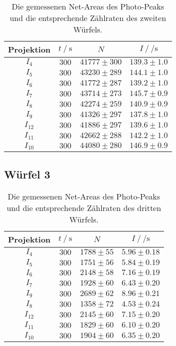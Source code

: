 \begin{table}[H]
  \centering
  \begin{tabular}{c c c c}
    \toprule
     Projektion &  $t \:/\: \si{\second}$ &     $N$ &           $I \:/\: \si{\per\second}$ \\
    \midrule
            $I_{  4}$ &   $300$ & $41777 \pm    300$ & $139.3\pm1.0$ \\
            $I_{  5}$ &   $300$ & $43230 \pm    289$ & $144.1\pm1.0$ \\
            $I_{  6}$ &   $300$ & $41772 \pm    287$ & $139.2\pm1.0$ \\
            $I_{  7}$ &   $300$ & $43714 \pm    273$ & $145.7\pm0.9$ \\
            $I_{  8}$ &   $300$ & $42274 \pm    259$ & $140.9\pm0.9$ \\
            $I_{  9}$ &   $300$ & $41326 \pm    297$ & $137.8\pm1.0$ \\
            $I_{ 12}$ &   $300$ & $41886 \pm    297$ & $139.6\pm1.0$ \\
            $I_{ 11}$ &   $300$ & $42662 \pm    288$ & $142.2\pm1.0$ \\
            $I_{ 10}$ &   $300$ & $44080 \pm    280$ & $146.9\pm0.9$ \\
    \bottomrule
    \end{tabular}
  \caption{Die gemessenen Net-Areas des Photo-Peaks und die entsprechende Zählraten des zweiten Würfels. }
  \label{tab:w2}
\end{table}

\subsection{Würfel 3}

\begin{table}[H]
  \centering
  \begin{tabular}{c c c c}
    \toprule
    Projektion &  $t \:/\: \si{\second}$ &     $N$ &           $I \:/\: \si{\per\second}$ \\
    \midrule
             $I_{ 4}$ &   $300$ & $1788 \pm   55$ & $5.96\pm0.18$ \\
             $I_{ 5}$ &   $300$ & $1751 \pm   56$ & $5.84\pm0.19$ \\
             $I_{ 6}$ &   $300$ & $2148 \pm   58$ & $7.16\pm0.19$ \\
             $I_{ 7}$ &   $300$ & $1928 \pm   60$ & $6.43\pm0.20$ \\
             $I_{ 9}$ &   $300$ & $2689 \pm   62$ & $8.96\pm0.21$ \\
             $I_{ 8}$ &   $300$ & $1358 \pm   72$ & $4.53\pm0.24$ \\
             $I_{12}$ &   $300$ & $2145 \pm   60$ & $7.15\pm0.20$ \\
             $I_{11}$ &   $300$ & $1829 \pm   60$ & $6.10\pm0.20$ \\
             $I_{10}$ &   $300$ & $1904 \pm   60$ & $6.35\pm0.20$ \\
    \bottomrule
  \end{tabular}
  \caption{Die gemessenen Net-Areas des Photo-Peaks und die entsprechende Zählraten des dritten Würfels. }
  \label{tab:w3}
\end{table}

